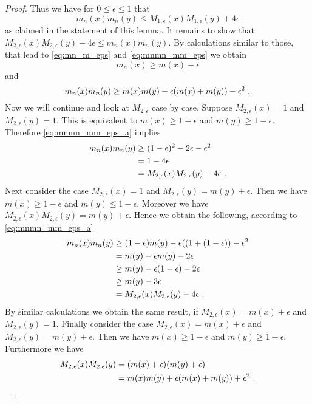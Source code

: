 \begin{lemma}
\begin{proof}
		Thus we have for $0\leq \epsilon\leq 1$ that 
		$$m_n(x)m_n(y) \leq M_{1,\epsilon}(x)M_{1,\epsilon}(y) + 4\epsilon$$
		as claimed in the statement of this lemma. It remains to show that $M_{2,\epsilon}(x)M_{2,\epsilon}(y) - 4\epsilon \leq m_n(x)m_n(y)$. By calculations similar to those, that lead to \eqref{eq:mn_m_eps} and \eqref{eq:mnmn_mm_eps} we obtain
		$$m_n(x) \geq m(x) - \epsilon$$
		and
		\begin{equation}
			m_n(x)m_n(y) \geq m(x)m(y) - \epsilon(m(x) + m(y)) - \epsilon^2 \textrm{ .} \label{eq:mnmn_mm_eps_a}
		\end{equation}
		Now we will continue and look at $M_{2,\epsilon}$ case by case. Suppose $M_{2,\epsilon}(x) = 1$ and $M_{2,\epsilon}(y) = 1$. This is equivalent to $m(x) \geq 1 - \epsilon$ and $m(y) \geq 1 - \epsilon$. Therefore \eqref{eq:mnmn_mm_eps_a} implies 
		\begin{align*}
			m_n(x)m_n(y) &\geq (1-\epsilon)^2 - 2\epsilon - \epsilon^2\\
			&= 1 - 4\epsilon\\
			&= M_{2,\epsilon}(x)M_{2,\epsilon}(y) - 4\epsilon\textrm{ .}
		\end{align*}
		Next consider the case $M_{2,\epsilon}(x) = 1$ and $M_{2,\epsilon}(y) = m(y) + \epsilon$. Then we have $m(x) \geq 1-\epsilon$ and  $m(y) \leq 1-\epsilon$. Moreover we have $M_{2,\epsilon}(x)M_{2,\epsilon}(y) = m(y) + \epsilon$. Hence we obtain the following, according to \eqref{eq:mnmn_mm_eps_a}
		\begin{align*}
			m_n(x)m_n(y) &\geq (1-\epsilon)m(y) - \epsilon((1 + (1-\epsilon)) - \epsilon^2\\
			&= m(y)-\epsilon m(y) - 2\epsilon\\
			&\geq m(y)-\epsilon (1-\epsilon) - 2\epsilon\\
			&\geq m(y)-3\epsilon \\
			&= M_{2,\epsilon}(x)M_{2,\epsilon}(y) - 4\epsilon\textrm{ .}
		\end{align*} 
		By similar calculations we obtain the same result, if $M_{2,\epsilon}(x) = m(x) + \epsilon$ and $M_{2,\epsilon}(y) = 1$. Finally consider the case $M_{2,\epsilon}(x) = m(x) + \epsilon$ and $M_{2,\epsilon}(y) = m(y) + \epsilon$. Then we have $m(x) \geq 1-\epsilon$ and $m(y) \geq 1-\epsilon$. Furthermore we have 
		\begin{align*}
			M_{2,\epsilon}(x)M_{2,\epsilon}(y) &= (m(x) +\epsilon)(m(y) + \epsilon)\\
			&= m(x)m(y) + \epsilon(m(x) + m(y)) + \epsilon^2\textrm{ .}
		\end{align*}

\end{proof}
\end{lemma}
